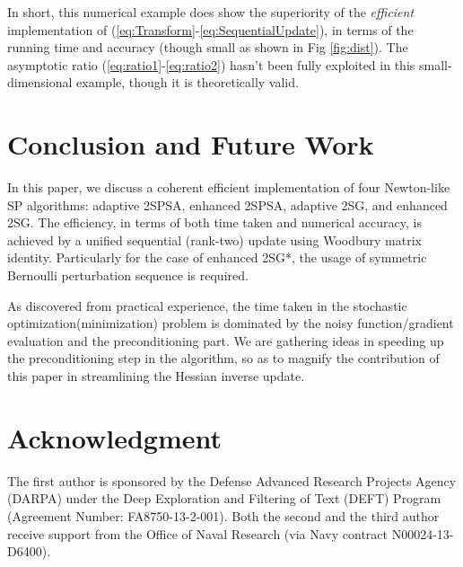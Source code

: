 \documentclass[conference,10.6cpt]{IEEEtran}
\begin{document}
In short, this numerical example does show the superiority of the \textit{efficient} implementation of (\ref{eq:Transform}-\ref{eq:SequentialUpdate}), in terms of the running time and accuracy (though small as shown in Fig \ref{fig:dist}). The asymptotic ratio (\ref{eq:ratio1}-\ref{eq:ratio2}) hasn't been fully exploited in this small-dimensional example, though it is theoretically valid.


\section{Conclusion and Future Work} In this paper, we discuss
a coherent efficient implementation of four Newton-like SP algorithms:
adaptive 2SPSA, enhanced 2SPSA, adaptive 2SG, and enhanced 2SG. The
efficiency, in terms of both time taken and numerical accuracy, is
achieved by a unified sequential (rank-two) update using Woodbury
matrix identity. Particularly for the case of enhanced 2SG*, the
usage of symmetric Bernoulli perturbation sequence is required.

As discovered from practical experience, the time taken in the
stochastic optimization(minimization) problem is dominated by the
noisy function/gradient evaluation and the preconditioning part. We
are gathering ideas in speeding up the preconditioning step in the
algorithm, so as to magnify the contribution of this paper in
streamlining the Hessian inverse update.

\section*{Acknowledgment} The first author is sponsored by the
Defense Advanced Research Projects Agency (DARPA) under the Deep
Exploration and Filtering of Text (DEFT) Program (Agreement Number:
FA8750-13-2-001). Both the second and the third author receive
support from the Office of Naval Research (via Navy contract
N00024-13-D6400).
\end{document}

